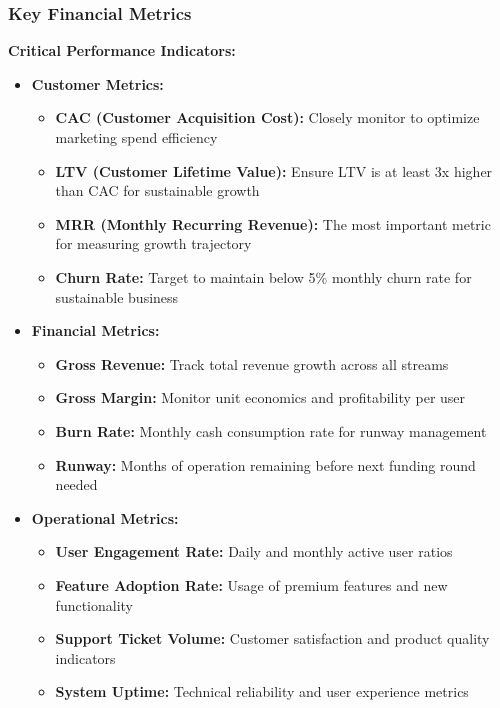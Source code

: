 \subsubsection{Key Financial Metrics}
\textbf{Critical Performance Indicators:}
\begin{itemize}
    \item \textbf{Customer Metrics:}
    \begin{itemize}
        \item \textbf{CAC (Customer Acquisition Cost):} Closely monitor to optimize marketing spend efficiency
        \item \textbf{LTV (Customer Lifetime Value):} Ensure LTV is at least 3x higher than CAC for sustainable growth
        \item \textbf{MRR (Monthly Recurring Revenue):} The most important metric for measuring growth trajectory
        \item \textbf{Churn Rate:} Target to maintain below 5\% monthly churn rate for sustainable business
    \end{itemize}
    \item \textbf{Financial Metrics:}
    \begin{itemize}
        \item \textbf{Gross Revenue:} Track total revenue growth across all streams
        \item \textbf{Gross Margin:} Monitor unit economics and profitability per user
        \item \textbf{Burn Rate:} Monthly cash consumption rate for runway management
        \item \textbf{Runway:} Months of operation remaining before next funding round needed
    \end{itemize}
    \item \textbf{Operational Metrics:}
    \begin{itemize}
        \item \textbf{User Engagement Rate:} Daily and monthly active user ratios
        \item \textbf{Feature Adoption Rate:} Usage of premium features and new functionality
        \item \textbf{Support Ticket Volume:} Customer satisfaction and product quality indicators
        \item \textbf{System Uptime:} Technical reliability and user experience metrics
    \end{itemize}
\end{itemize}


